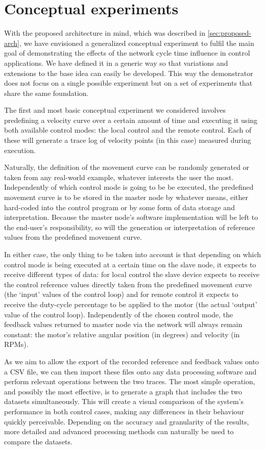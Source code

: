 \section{Conceptual experiments} \label{sec:experiments}

With the proposed architecture in mind, which was described in \autoref{sec:proposed-arch}, we have envisioned a generalized conceptual experiment to fulfil the main goal of demonstrating the effects of the network cycle time influence in control applications.
We have defined it in a generic way so that variations and extensions to the base idea can easily be developed.
This way the demonstrator does not focus on a single possible experiment but on a set of experiments that share the same foundation.

The first and most basic conceptual experiment we considered involves predefining a velocity curve over a certain amount of time and executing it using both available control modes: the local control and the remote control.
Each of these will generate a trace log of velocity points (in this case) measured during execution.

Naturally, the definition of the movement curve can be randomly generated or taken from any real-world example, whatever interests the user the most.
Independently of which control mode is going to be be executed, the predefined movement curve is to be stored in the master node by whatever means, either hard-coded into the control program or by some form of data storage and interpretation.
Because the master node's software implementation will be left to the end-user's responsibility, so will the generation or interpretation of reference values from the predefined movement curve.

In either case, the only thing to be taken into account is that depending on which control mode is being executed at a certain time on the slave node, it expects to receive different types of data: for local control the slave device expects to receive the control reference values directly taken from the predefined movement curve (the `input' values of the control loop) and for remote control it expects to receive the duty-cycle percentage to be applied to the motor (the actual `output' value of the control loop).
Independently of the chosen control mode, the feedback values returned to master node via the network will always remain constant: the motor's relative angular position (in degrees) and velocity (in RPMs).

As we aim to allow the export of the recorded reference and feedback values onto a CSV file, we can then import these files onto any data processing software and perform relevant operations between the two traces.
The most simple operation, and possibly the most effective, is to generate a graph that includes the two datasets simultaneously.
This will create a visual comparison of the system's performance in both control cases, making any differences in their behaviour quickly perceivable.
Depending on the accuracy and granularity of the results, more detailed and advanced processing methods can naturally be used to compare the datasets.

